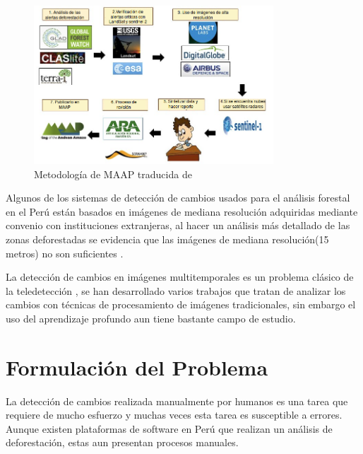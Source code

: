 \begin{figure}[H]

\centering
\includegraphics[width=0.8\textwidth]{images/MetologiaMAAPv2.png}
\caption{Metodología de \gls{MAAP} traducida de \cite{AmazonConservation} }
\label{maap}

\end{figure}

Algunos de los sistemas de detección de cambios usados para el análisis forestal en el Perú están basados en imágenes de mediana resolución adquiridas mediante convenio con instituciones extranjeras, al hacer un análisis más detallado de las zonas deforestadas se evidencia que las imágenes de mediana resolución(15 metros) no son suficientes \cite{hansen2013high}.

La detección de cambios en imágenes multitemporales es un problema clásico de la teledetección \cite{Zhu2017}, se han desarrollado varios trabajos que tratan de analizar los cambios con técnicas de procesamiento de imágenes tradicionales\cite{hansen2013high,AlenCastro2015,Anwar2012,Hirschmugl2014,Zhu2014}, sin embargo el uso del aprendizaje profundo aun tiene bastante campo de estudio.













\section{Formulación del Problema}
La detección de cambios realizada manualmente por humanos es una tarea que requiere de mucho esfuerzo y muchas veces esta tarea es susceptible a errores. Aunque existen plataformas de software en Perú que realizan un análisis de deforestación, estas aun presentan procesos manuales.

